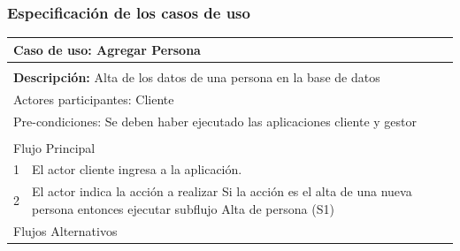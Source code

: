 \documentclass[11pt]{article}
\begin{document}
\subsubsection{Especificaci\'on de los casos de uso}
  \begin{tabular}{|l|m{}|}
    \hline
    \multicolumn{2}{|m{0.9\textwidth}|}{{\bf Caso de uso: Agregar Persona}} \\
    \hline
    \multicolumn{2}{|l|}{\rowcolor[gray]{.5}} \\
    \hline
  
    \multicolumn{2}{|p{0.9\textwidth}|}{{\bf Descripción:} Alta de los datos de una 
    persona en la base de datos } \\
  
    \hline
    \multicolumn{2}{|l|}{Actores participantes: Cliente} \\
    \hline
  
    \multicolumn{2}{|l|}{Pre-condiciones: Se deben haber ejecutado las aplicaciones cliente 
    y gestor} \\
  
    \hline
    \multicolumn{2}{|l|}{\rowcolor[gray]{.5}} \\
    \hline
    \multicolumn{2}{|l|}{Flujo Principal} \\
    \hline
    1 & El actor cliente ingresa a la aplicaci\'on. \\
    \hline
    2 &  El actor indica la acción a realizar \newline
    Si la acción es el alta de una nueva persona entonces ejecutar subflujo Alta de persona (S1)\newline
   \\
    
    \hline
    \multicolumn{2}{|l|}{Flujos Alternativos} \\
    \hline
  

\end{tabular}
\end{document}
